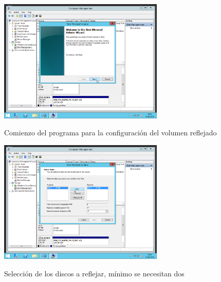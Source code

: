 \begin{figure}[H]
	\begin{center}
		\includegraphics[width=0.7\textwidth]{Imagenes/03_Iniciando-proceso-de-volumen-reflejado}
		\caption{Comienzo del programa para la configuración del volumen reflejado} \label{fig:figura13}
		\includegraphics[width=0.7\textwidth]{Imagenes/04_Anadiendo-volumenes-reflejados}
		\caption{Selección de los discos a reflejar, mínimo se necesitan dos} \label{fig:figura14}
	\end{center}
\end{figure}

